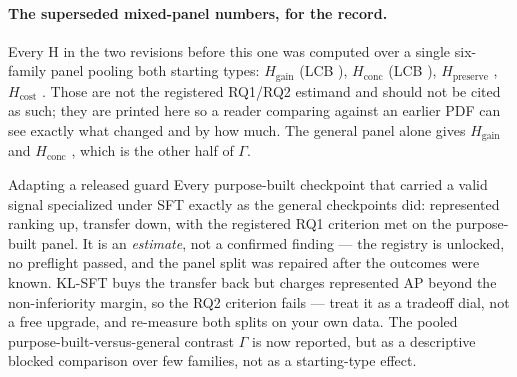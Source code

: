 \paragraph{The superseded mixed-panel numbers, for the record.} Every H in the two revisions before
this one was computed over a single six-family panel pooling both starting types:
$H_{\mathrm{gain}}$ \AdaMixedHGain{} (LCB \AdaMixedHGainLCB), $H_{\mathrm{conc}}$ \AdaMixedHConc{}
(LCB \AdaMixedHConcLCB), $H_{\mathrm{preserve}}$ \AdaMixedHPreserve, $H_{\mathrm{cost}}$
\AdaMixedHCost. Those are not the registered RQ1/RQ2 estimand and should not be cited as such; they are
printed here so a reader comparing against an earlier PDF can see exactly what changed and by how much.
The general panel alone gives $H_{\mathrm{gain}}$ \AdaGenHGain{} and $H_{\mathrm{conc}}$ \AdaGenHConc,
which is the other half of $\Gamma$.

\begin{takeaway}{Adapting a released guard}
Every purpose-built checkpoint that carried a valid signal specialized under SFT exactly as the general
checkpoints did: represented ranking up, transfer down, with the registered RQ1 criterion met on the
purpose-built panel. It is an \emph{estimate}, not a confirmed finding --- the registry is unlocked, no
preflight passed, and the panel split was repaired after the outcomes were known. KL-SFT buys the
transfer back but charges represented AP beyond the non-inferiority margin, so the RQ2 criterion fails
--- treat it as a tradeoff dial, not a free upgrade, and re-measure both splits on your own data. The
pooled purpose-built-versus-general contrast $\Gamma$ is now reported, but as a descriptive blocked
comparison over few families, not as a starting-type effect.
\end{takeaway}
